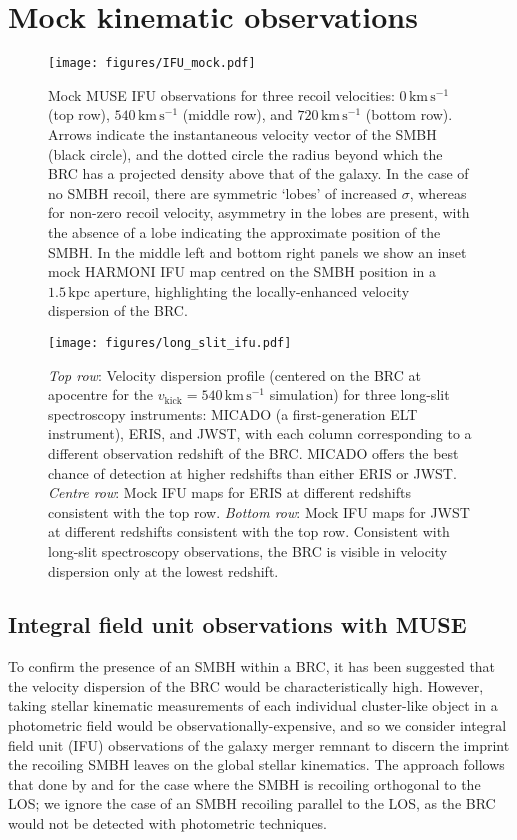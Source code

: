 \documentclass[twocolumn]{aastex631}
\newcommand{\kmps}{\ensuremath{\mathrm{km}\,\mathrm{s}^{-1}} }%
\newcommand{\vk}{\ensuremath{v_\mathrm{kick}}}                %
\begin{document}
\section{Mock kinematic observations}\label{sec:kinematics}
\begin{figure*}[t]
    \centering
    \texttt{[image: figures/IFU\_mock.pdf]}
    \caption{ 
        Mock MUSE IFU observations for three recoil velocities: $0\,\kmps$ (top row), $540\,\kmps$ (middle row), and $720\,\kmps$ (bottom row).
        Arrows indicate the instantaneous velocity vector of the SMBH (black circle), and the dotted circle the radius beyond which the BRC has a projected density above that of the galaxy.
        In the case of no SMBH recoil, there are symmetric `lobes' of increased $\sigma$, whereas for non-zero recoil velocity, asymmetry in the lobes are present, with the absence of a lobe indicating the approximate position of the SMBH.
        In the middle left and bottom right panels we show an inset mock HARMONI IFU map centred on the SMBH position in a $1.5\,\mathrm{kpc}$ aperture, highlighting the locally-enhanced velocity dispersion of the BRC.
    }
    \label{fig:ifu}
\end{figure*}
\begin{figure*}[t]
    \centering
    \texttt{[image: figures/long\_slit\_ifu.pdf]}
    \caption{
        \textit{Top row}: Velocity dispersion profile (centered on the BRC at apocentre for the $\vk=540\,\kmps$ simulation) for three long-slit spectroscopy instruments: MICADO (a first-generation ELT instrument), ERIS, and JWST, with each column corresponding to a different observation redshift of the BRC.
        MICADO offers the best chance of detection at higher redshifts than either ERIS or JWST.
        \textit{Centre row}: Mock IFU maps for ERIS at different redshifts consistent with the top row.
        \textit{Bottom row}: Mock IFU maps for JWST at different redshifts consistent with the top row.
        Consistent with long-slit spectroscopy observations, the BRC is visible in velocity dispersion only at the lowest redshift.
    }
    \label{fig:lss}
\end{figure*}
\subsection{Integral field unit observations with MUSE}\label{ssec:IFU_observations}
To confirm the presence of an SMBH within a BRC, it has been suggested \citep[e.g.][]{merritt2013} that the velocity dispersion of the BRC would be characteristically high.
However, taking stellar kinematic measurements of each individual cluster-like object in a photometric field would be observationally-expensive, and so we consider integral field unit (IFU) observations of the galaxy merger remnant to discern the imprint the recoiling SMBH leaves on the global stellar kinematics. 
The approach follows that done by \citet{naab2014} and \citet{rawlings2025} for the case where the SMBH is recoiling orthogonal to the LOS; we ignore the case of an SMBH recoiling parallel to the LOS, as the BRC would not be detected with photometric techniques.
\end{document}
